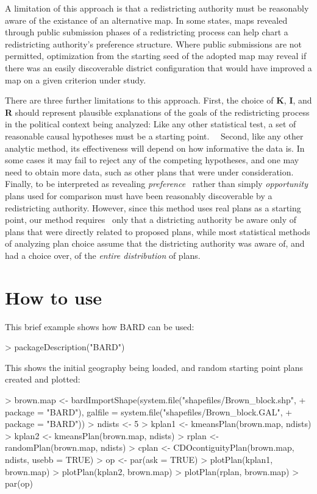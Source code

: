 \documentclass[article]{JSSstyle/jss}
\begin{document}
A limitation of this approach is that a redistricting authority must be reasonably aware
of the existance of an alternative map.  In some states, maps revealed through 
public submission phases of a redistricting process can help chart a redistricting authority's preference
structure.  Where public submissions are not permitted, optimization from the starting seed of the 
adopted map may reveal if there was an easily discoverable district configuration that would have improved
a map on a given criterion under study.

There are three further limitations to this approach.  First, the choice of \textbf{K},\textbf{ I},\textbf{
}and\textbf{ R} should represent plausible explanations of the goals of
the redistricting process in the political context being analyzed: Like
any other statistical test, a set of reasonable causal hypotheses must
be a starting point. \ \ Second, like any other analytic method, its
effectiveness will depend on how informative the data is. In some cases
it may fail to reject any of the competing hypotheses, and one may need
to obtain more data, such as other plans that were under consideration.
Finally, to be interpreted as revealing \textit{preference
}\textup{\ rather than simply }\textit{opportunity }plans used for
comparison must have been reasonably discoverable by a redistricting
authority. However, since this method uses real plans as a starting
point, our method requires \ only that a districting authority be aware
only of plans that were directly related to proposed plans, while most
statistical methods of analyzing plan choice assume that the
districting authority was aware of, and had a choice over, of the
\textit{entire distribution }of plans.

\section[How to use BARD]{How to use }

This brief example shows how BARD can be used: 



\begin{Schunk}
\begin{Sinput}
> packageDescription("BARD")
\end{Sinput}
\end{Schunk}

This shows the initial geography being loaded, and random starting point plans created and plotted:
\begin{Schunk}
\begin{Sinput}
> brown.map <- bardImportShape(system.file("shapefiles/Brown_block.shp", 
+     package = "BARD"), galfile = system.file("shapefiles/Brown_block.GAL", 
+     package = "BARD"))
> ndists <- 5
> kplan1 <- kmeansPlan(brown.map, ndists)
> kplan2 <- kmeansPlan(brown.map, ndists)
> rplan <- randomPlan(brown.map, ndists)
> cplan <- CDOcontiguityPlan(brown.map, ndists, usebb = TRUE)
> op <- par(ask = TRUE)
> plotPlan(kplan1, brown.map)
> plotPlan(kplan2, brown.map)
> plotPlan(rplan, brown.map)
> par(op)
\end{Sinput}
\end{Schunk}
\end{document}
